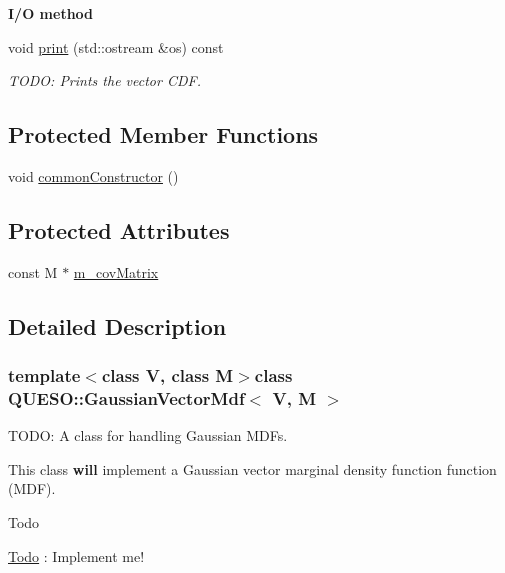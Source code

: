 \begin{Indent}{\bf I/\-O method}\par
\begin{DoxyCompactItemize}
\item 
void \hyperlink{class_q_u_e_s_o_1_1_gaussian_vector_mdf_aae69a5b89169542b47de4b0dfa2e60e5}{print} (std\-::ostream \&os) const 
\begin{DoxyCompactList}\small\item\em T\-O\-D\-O\-: Prints the vector C\-D\-F. \end{DoxyCompactList}\end{DoxyCompactItemize}
\end{Indent}
\subsection*{Protected Member Functions}
\begin{DoxyCompactItemize}
\item 
void \hyperlink{class_q_u_e_s_o_1_1_gaussian_vector_mdf_ab1f0a239a1e16282909db1e02e8fb1cb}{common\-Constructor} ()
\end{DoxyCompactItemize}
\subsection*{Protected Attributes}
\begin{DoxyCompactItemize}
\item 
const M $\ast$ \hyperlink{class_q_u_e_s_o_1_1_gaussian_vector_mdf_ad87107b4a431d4bb7b8a2c1409b71e14}{m\-\_\-cov\-Matrix}
\end{DoxyCompactItemize}


\subsection{Detailed Description}
\subsubsection*{template$<$class V, class M$>$class Q\-U\-E\-S\-O\-::\-Gaussian\-Vector\-Mdf$<$ V, M $>$}

T\-O\-D\-O\-: A class for handling Gaussian M\-D\-Fs. 

This class {\bfseries will} implement a Gaussian vector marginal density function function (M\-D\-F). \begin{DoxyRefDesc}{Todo}
\item[\hyperlink{todo__todo000023}{Todo}]\-: Implement me! \end{DoxyRefDesc}


